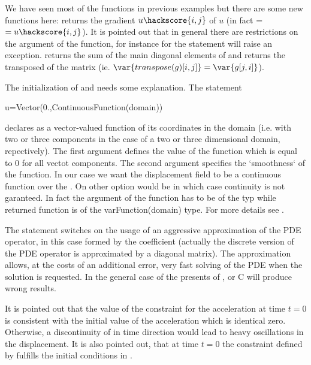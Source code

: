 We have seen most of the functions in previous examples but there are some new functions here: 
 returns the gradient $u\hackscore{i,j}$ of $u$ (in fact =$=u\hackscore{i,j}$).
It is pointed out that in general there are restrictions on the argument of the  function, for instance
for \finley the statement  will raise an exception.
 returns the sum of the main diagonal elements  of  
and  returns the transposed of the matrix  (ie. 
$\var{transpose(g)[i,j]}=\var{g[j,i]}$). 

The initialization of  and  needs some explanation. The statement
\begin{python}
u=Vector(0.,ContinuousFunction(domain))
\end{python}
declares  as a vector-valued function of its coordinates 
in the domain (i.e. with two or three components in the case of 
a two or three dimensional domain, repectively). The first argument defines the value of the function which is equal
to $0$ for all vectot components. The second argument  
specifies the `smoothness` of the function. In our case we want the displacement field to be 
a continuous function over the \Domain {}. On other option would be 
 in which case continuity is not garanteed. In fact the 
argument of the  function has to be of the typ  while
returned function is of the var{Function(domain)} type. For more details see . 

The statement 
switches on the usage of an aggressive approximation of the PDE operator, in this case
formed by the coefficient  (actually the discrete 
version of the PDE operator is approximated by a diagonal matrix). The approximation allows, at the costs of 
an additional error, very fast 
solving of the PDE when the solution is requested. In the general case of the presents of ,  or \var
{C}  will produce wrong results.

It is pointed out that the value of the constraint  for the acceleration  at time $t=0$ is consistent 
with the initial value of the acceleration which is identical zero. Otherwise, a discontinuity of  in time 
direction would lead to heavy oscillations in the displacement. It is also pointed out, that at time $t=0$ the 
constraint defined by  fulfills
the initial conditions in . 


